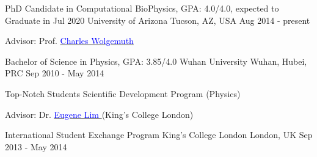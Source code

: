 
\begin{cventries}
  \cventry
    {PhD Candidate in Computational BioPhysics, GPA: 4.0/4.0, expected to Graduate in Jul 2020} %
    {University of Arizona} %
    {Tucson, AZ, USA} %
    {Aug 2014 - present} %
    {  \begin{cvitems} %
         \item {Advisor: Prof. \href{http://www.physics.arizona.edu/~wolg}{\textcolor{blue}{Charles Wolgemuth} } }
      \end{cvitems}
    }

  \cventry
    {Bachelor of Science in Physics, GPA: 3.85/4.0} %
    {Wuhan University} %
    {Wuhan, Hubei, PRC} %
    {Sep 2010 - May 2014} %
    {  \begin{cvitems} %
         \item {Top-Notch Students Scientific Development Program (Physics)}
         \item {Advisor: Dr. \href{https://www.kcl.ac.uk/people/eugene-lim}{\textcolor{blue}{Eugene Lim} }(King's College London) }
      \end{cvitems}
    }
   
  \cventry
    {International Student Exchange Program} %
    {King's College London} %
    {London, UK} %
    {Sep 2013 - May 2014} %
    {}    
\end{cventries}
